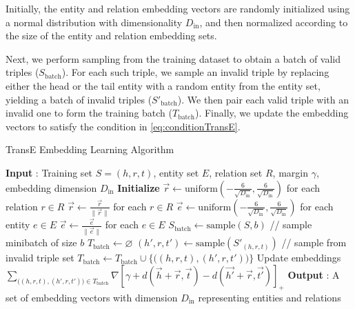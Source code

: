 Initially, the entity and relation embedding vectors are randomly initialized using a normal distribution with dimensionality $D_{\text{in}}$, and then normalized according to the size of the entity and relation embedding sets.


Next, we perform sampling from the training dataset to obtain a batch of valid triples ($S_{\text{batch}}$). For each such triple, we sample an invalid triple by replacing either the head or the tail entity with a random entity from the entity set, yielding a batch of invalid triples ($S'_{\text{batch}}$). We then pair each valid triple with an invalid one to form the training batch ($T_{\text{batch}}$). Finally, we update the embedding vectors to satisfy the condition in \ref{eq:conditionTransE}.

\begin{algorithm}
	\caption{TransE Embedding Learning Algorithm \protect\cite{bordes2013translating}}\label{alg:TransE}
	\begin{algorithmic}[1]
		\Statex \textbf{Input} :
		Training set $S = {(h, r, t)}$, entity set $E$, relation set $R$, margin $\gamma$, embedding dimension $D_{\text{in}}$	
		\Statex \textbf{Initialize}
		\State $\overrightarrow{r} \leftarrow \text{uniform}(-\frac{6}{\sqrt{D_{\text{in}}}}, \frac{6}{\sqrt{D_{\text{in}}}})$ for each relation $r \in R$
		\State $\overrightarrow{r} \leftarrow \frac{\overrightarrow{r}}{\|\overrightarrow{r}\|}$ for each $r \in R$
		\State $\overrightarrow{e} \leftarrow \text{uniform}(-\frac{6}{\sqrt{D_{\text{in}}}}, \frac{6}{\sqrt{D_{\text{in}}}})$ for each entity $e \in E$
		\Loop
		\State $\overrightarrow{e} \leftarrow \frac{\overrightarrow{e}}{\|\overrightarrow{e}\|}$ for each $e \in E$
		\State $S_{\text{batch}} \leftarrow \text{sample}(S, b)$  // sample minibatch of size $b$
		\State $T_{\text{batch}} \leftarrow \varnothing $
		\State $(h', r, t') \leftarrow \text{sample}(S'_{(h, r, t)})$ // sample from invalid triple set
		\State $T_{\text{batch}} \leftarrow T_{\text{batch}} \cup \Big\{ \Big( (h, r, t), (h', r, t') \Big) \Big\}$
		\EndFor
		\Statex Update embeddings
		\State $\sum_{\Big( (h, r, t), (h', r, t')\Big) \in T_{\text{batch}}} \nabla [\gamma + d(\overrightarrow{h} + \overrightarrow{r}, \overrightarrow{t}) - d(\overrightarrow{h'} + \overrightarrow{r}, \overrightarrow{t'})]_{+}$
		\EndLoop
		\Statex \textbf{Output} :
		A set of embedding vectors with dimension $D_{\text{in}}$ representing entities and relations
	\end{algorithmic}
\end{algorithm}

